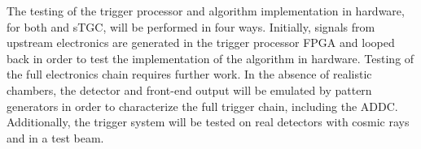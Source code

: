 The testing of the trigger processor and algorithm
implementation in hardware, for both \MM and sTGC, will be
performed in four ways. Initially, signals from upstream electronics
are generated in the trigger processor FPGA and looped back in
order to test the implementation of the algorithm in hardware. Testing of the full
electronics chain requires further work. In
the absence of realistic chambers, the
detector and front-end output will be emulated by pattern generators
in order to characterize the full trigger chain, including
the ADDC. Additionally, the trigger
system will be tested on real detectors with cosmic rays and in a
test beam.